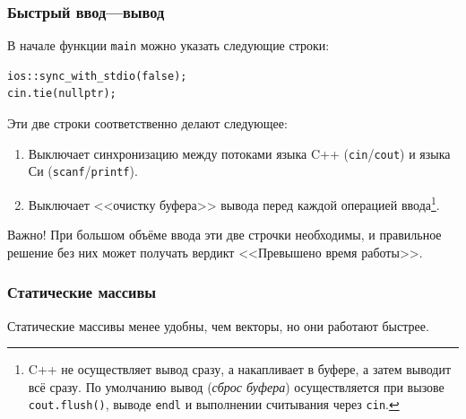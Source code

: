 \documentclass{article}
\newcommand{\important}[1]{
	\begin{sectionenv}[red!30!white]{Важно!}
		#1
	\end{sectionenv}
}
\begin{document}
	\subsubsection{Быстрый ввод---вывод}
	
	В начале функции \texttt{main} можно указать следующие строки:
	
	\begin{lstlisting}
ios::sync_with_stdio(false);
cin.tie(nullptr);
	\end{lstlisting}
	
	Эти две строки соответственно делают следующее:
	
	\begin{enumerate}
		\item Выключает синхронизацию между потоками языка C++ (\texttt{cin}/\texttt{cout}) и языка Си (\texttt{scanf}/\texttt{printf}).
		\item Выключает <<очистку буфера>> вывода перед каждой операцией ввода\footnote{C++ не осуществляет вывод сразу, а накапливает в буфере, а затем выводит всё сразу. По умолчанию вывод (\textit{сброс буфера}) осуществляется при вызове \texttt{cout.flush()}, выводе \texttt{endl} и выполнении считывания через \texttt{cin}.}.
	\end{enumerate}
	
	\important{При большом объёме ввода эти две строчки необходимы, и правильное решение без них может получать вердикт <<Превышено время работы>>.}
	
	\subsubsection{Статические массивы}
	
	Статические массивы менее удобны, чем векторы, но они работают быстрее.
	
\end{document}
